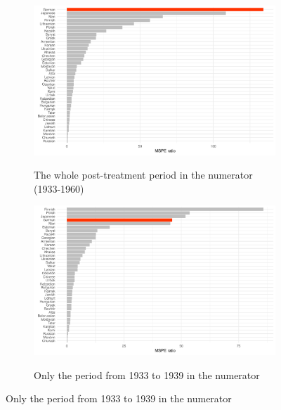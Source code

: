 \begin{figure}[hbtp] 
\caption{Ratios of post-treatment MSPE to pre-treatment MSPE}
\begin{subfigure}{\textwidth}
\caption{The whole post-treatment period in the numerator (1933-1960)}
\includegraphics[width=\linewidth]{plots/synthetic_control/ethnicity_imputation/annual/mspe_ratios_imp_date.pdf}
\label{fig:sc_mspe_ratios_all}
\end{subfigure}
\begin{subfigure}{\textwidth}
\caption{Only the period from 1933 to 1939 in the numerator}
\includegraphics[width=\linewidth]{plots/synthetic_control/ethnicity_imputation/annual/mspe_ratios_imp_date_until_1939.pdf}
\label{fig:sc_mspe_ratios_until_1939}
\end{subfigure}
\label{fig:sc_mspe_ratios}
\end{figure}




